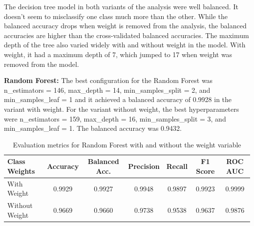 \documentclass[a4paper,12pt]{article}
\begin{document}
The decision tree model in both variants of the analysis were well balanced. It doesn't seem to misclassify one class much more than the other. While the balanced accuracy drops when weight is removed from the analysis, the balanced accuracies are higher than the cross-validated balanced accuracies. The maximum depth of the tree also varied widely with and without weight in the model. With weight, it had a maximum depth of 7, which jumped to 17 when weight was removed from the model.

\textbf{Random Forest:}
The best configuration for the Random Forest was n\_estimators = 146, max\_depth = 14, min\_samples\_split = 2, and min\_samples\_leaf = 1 and it achieved a balanced accuracy of 0.9928 in the variant with weight. For the variant without weight, the best hyperparameters were n\_estimators = 159, max\_depth = 16, min\_samples\_split = 3, and min\_samples\_leaf = 1. The balanced accuracy was 0.9432.
 
\begin{table}[H]
\centering
\small
\begin{tabular}{lcccccc}
\toprule
\textbf{Class Weights} & \textbf{Accuracy} & \textbf{Balanced Acc.} & \textbf{Precision} & \textbf{Recall} & \textbf{F1 Score} & \textbf{ROC AUC} \\
\midrule
With Weight & 0.9929 & 0.9927 & 0.9948 & 0.9897 & 0.9923 & 0.9999 \\
Without Weight & 0.9669 & 0.9660 & 0.9738 & 0.9538 & 0.9637 & 0.9876 \\
\bottomrule
\end{tabular}
\caption{Evaluation metrics for Random Forest with and without the weight variable}
\label{tab:rf_weights}
\end{table}
\end{document}
